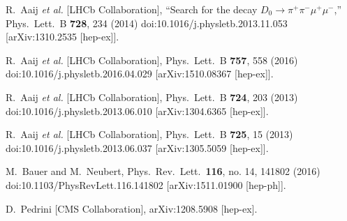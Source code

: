 \documentclass{PoS}
\begin{document}
\begin{thebibliography}{99}
  R.~Aaij {\it et al.} [LHCb Collaboration],
 ``Search for the decay $D_0 \to \pi^+ \pi^- \mu^+ \mu^-$,''
  Phys.\ Lett.\ B {\bf 728}, 234 (2014)
  doi:10.1016/j.physletb.2013.11.053
  [arXiv:1310.2535 [hep-ex]].

  R.~Aaij {\it et al.} [LHCb Collaboration],
  Phys.\ Lett.\ B {\bf 757}, 558 (2016)
  doi:10.1016/j.physletb.2016.04.029
  [arXiv:1510.08367 [hep-ex]].


  R.~Aaij {\it et al.} [LHCb Collaboration],
  Phys.\ Lett.\ B {\bf 724}, 203 (2013)
  doi:10.1016/j.physletb.2013.06.010
  [arXiv:1304.6365 [hep-ex]].

  R.~Aaij {\it et al.} [LHCb Collaboration],
  Phys.\ Lett.\ B {\bf 725}, 15 (2013)
  doi:10.1016/j.physletb.2013.06.037
  [arXiv:1305.5059 [hep-ex]].
 
  M.~Bauer and M.~Neubert,
  Phys.\ Rev.\ Lett.\  {\bf 116}, no. 14, 141802 (2016)
  doi:10.1103/PhysRevLett.116.141802
  [arXiv:1511.01900 [hep-ph]].

  D.~Pedrini [CMS Collaboration],
  arXiv:1208.5908 [hep-ex].

\end{thebibliography}
\end{document}
